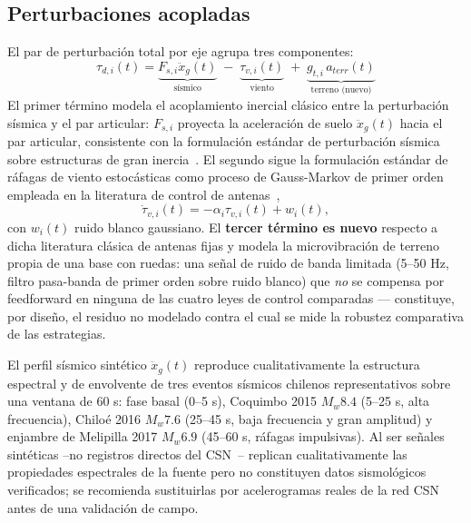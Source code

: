 \documentclass[journal]{IEEEtran}
\begin{document}
\subsection{Perturbaciones acopladas}
\label{sec:perturbaciones}
El par de perturbación total por eje agrupa tres componentes:
\begin{equation}
\tau_{d,i}(t) = \underbrace{F_{s,i}\ddot{x}_g(t)}_{\text{sísmico}} \;-\; \underbrace{\tau_{v,i}(t)}_{\text{viento}} \;+\; \underbrace{g_{t,i}\,a_{terr}(t)}_{\text{terreno (nuevo)}}
\label{eq:disturbance}
\end{equation}
El primer término modela el acoplamiento inercial clásico entre la
perturbación sísmica y el par articular: $F_{s,i}$ proyecta la
aceleración de suelo $\ddot x_g(t)$ hacia el par articular, consistente
con la formulación estándar de perturbación sísmica sobre estructuras de
gran inercia~\cite{gawronski2008modeling}. El segundo sigue la
formulación estándar de ráfagas de viento estocásticas como proceso de
Gauss-Markov de primer orden empleada en la literatura de control de
antenas~\cite{qiu2014practical,gawronski2008modeling},
\begin{equation}
\dot\tau_{v,i}(t) = -\alpha_i\tau_{v,i}(t) + w_i(t),
\label{eq:gaussmarkov}
\end{equation}
con $w_i(t)$ ruido blanco gaussiano. El \textbf{tercer término es nuevo}
respecto a dicha literatura clásica de antenas fijas y modela la
microvibración de terreno propia de una base con ruedas: una señal de
ruido de banda limitada (5--50 Hz, filtro pasa-banda de primer orden
sobre ruido blanco) que \emph{no} se compensa por feedforward en ninguna
de las cuatro leyes de control comparadas --- constituye, por diseño, el
residuo no modelado contra el cual se mide la robustez comparativa de las
estrategias.

El perfil sísmico sintético $\ddot x_g(t)$ reproduce cualitativamente la
estructura espectral y de envolvente de tres eventos sísmicos chilenos
representativos sobre una ventana de 60 s: fase basal (0--5 s), Coquimbo
2015 $M_w 8.4$ (5--25 s, alta frecuencia), Chiloé 2016 $M_w 7.6$
(25--45 s, baja frecuencia y gran amplitud) y enjambre de Melipilla 2017
$M_w 6.9$ (45--60 s, ráfagas impulsivas). Al ser señales sintéticas --no
registros directos del CSN~\cite{csn2025reporte}-- replican
cualitativamente las propiedades espectrales de la fuente pero no
constituyen datos sismológicos verificados; se recomienda sustituirlas
por acelerogramas reales de la red CSN antes de una validación de campo.
\end{document}
